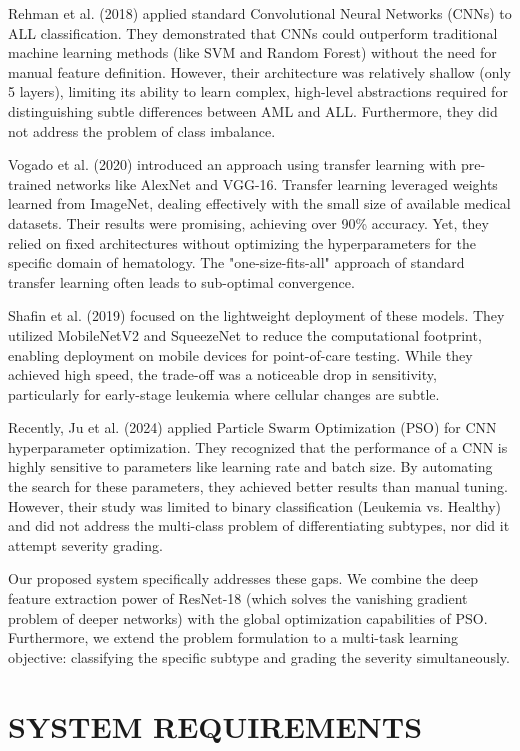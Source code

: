 \documentclass[twocolumn,10pt,a4paper]{article}
\begin{document}
Rehman et al. (2018) applied standard Convolutional Neural Networks (CNNs) to ALL classification. They demonstrated that CNNs could outperform traditional machine learning methods (like SVM and Random Forest) without the need for manual feature definition. However, their architecture was relatively shallow (only 5 layers), limiting its ability to learn complex, high-level abstractions required for distinguishing subtle differences between AML and ALL. Furthermore, they did not address the problem of class imbalance.

Vogado et al. (2020) introduced an approach using transfer learning with pre-trained networks like AlexNet and VGG-16. Transfer learning leveraged weights learned from ImageNet, dealing effectively with the small size of available medical datasets. Their results were promising, achieving over 90\% accuracy. Yet, they relied on fixed architectures without optimizing the hyperparameters for the specific domain of hematology. The "one-size-fits-all" approach of standard transfer learning often leads to sub-optimal convergence.

Shafin et al. (2019) focused on the lightweight deployment of these models. They utilized MobileNetV2 and SqueezeNet to reduce the computational footprint, enabling deployment on mobile devices for point-of-care testing. While they achieved high speed, the trade-off was a noticeable drop in sensitivity, particularly for early-stage leukemia where cellular changes are subtle.

Recently, Ju et al. (2024) applied Particle Swarm Optimization (PSO) for CNN hyperparameter optimization. They recognized that the performance of a CNN is highly sensitive to parameters like learning rate and batch size. By automating the search for these parameters, they achieved better results than manual tuning. However, their study was limited to binary classification (Leukemia vs. Healthy) and did not address the multi-class problem of differentiating subtypes, nor did it attempt severity grading.

Our proposed system specifically addresses these gaps. We combine the deep feature extraction power of ResNet-18 (which solves the vanishing gradient problem of deeper networks) with the global optimization capabilities of PSO. Furthermore, we extend the problem formulation to a multi-task learning objective: classifying the specific subtype and grading the severity simultaneously.

\section{SYSTEM REQUIREMENTS}
\end{document}
